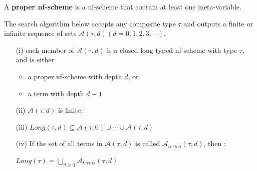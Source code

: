 \documentclass[a4paper,10pt]{article}
\begin{document}
\begin{mydef}\label{8C1.1}
 A \textbf{proper nf-scheme} is a nf-scheme that contain at least one meta-variable.
\end{mydef}


\begin{lem}\label{8C5}
  The search algorithm below accepts any composite type $\tau$ and
  outputs a finite or infinite sequence of sets $\mathcal{A}(\tau,d) (d =
  0,1,2,3,\cdots)$,

    \begin{itemize}
           \item[(i)] each member of $\mathcal{A}(\tau,d)$ is a closed long
             typed nf-scheme with type $\tau$, and is either

             \begin{itemize}
                   \item a proper nf-scheme with depth $d$, or
                   \item a term with depth $d-1$
             \end{itemize}

             \item[(ii)] $\mathcal{A}(\tau,d)$ is finite.

             \item[(iii)] $Long(\tau,d) \subseteq \mathcal{A}(\tau,0) \cup
               \cdots \cup \mathcal{A}(\tau,d)$

             \item[(iv)] If the set of all terms in $\mathcal{A}(\tau,d)$ is
               called $\mathcal{A}_{terms}(\tau,d)$, then :

               \begin{center}
                     $Long(\tau) = \bigcup_{d \geq 0}\mathcal{A}_{terms}(\tau,d)$
               \end{center}
    \end{itemize}
\end{lem}
\end{document}
